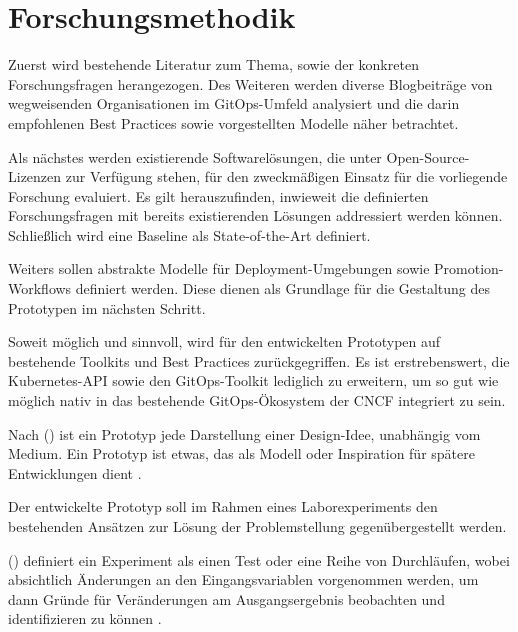 \chapter{Forschungsmethodik}

Zuerst wird bestehende Literatur zum Thema, 
sowie der konkreten Forschungsfragen herangezogen.
Des Weiteren werden
diverse Blogbeiträge von wegweisenden Organisationen im GitOps-Umfeld analysiert
und die darin empfohlenen Best Practices sowie vorgestellten Modelle näher betrachtet.
\bigskip

\noindent
Als nächstes werden existierende Softwarelösungen,
die unter Open-Source-Lizenzen zur Verfügung stehen,
für den zweckmäßigen Einsatz für die vorliegende Forschung evaluiert.
Es gilt herauszufinden, inwieweit die definierten Forschungsfragen
mit bereits existierenden Lösungen
addressiert werden können.
Schließlich wird eine Baseline als State-of-the-Art definiert.
\bigskip

\noindent
Weiters sollen abstrakte Modelle für Deployment-Umgebungen
sowie Promotion-Workflows definiert werden.
Diese dienen als Grundlage für die Gestaltung des Prototypen
im nächsten Schritt.
\bigskip

\noindent
Soweit möglich und sinnvoll, wird für den entwickelten Prototypen
auf bestehende Toolkits und Best Practices zurückgegriffen.
Es ist erstrebenswert,
die Kubernetes-API
sowie den
GitOps-Toolkit
lediglich zu erweitern,
um so gut wie möglich nativ in das bestehende GitOps-Ökosystem 
der CNCF
integriert zu sein.
\bigskip

\noindent
Nach 
\citeauthor{HOUDE1997367} (\citeyear{HOUDE1997367})
ist ein Prototyp jede Darstellung einer Design-Idee, unabhängig vom Medium.
Ein Prototyp ist etwas, das als Modell oder Inspiration für spätere Entwicklungen dient
\autocite{HOUDE1997367}.
\bigskip

\noindent
Der entwickelte Prototyp soll im Rahmen eines Laborexperiments
den bestehenden Ansätzen zur Lösung der Problemstellung gegenübergestellt werden.
\bigskip

\noindent
\citeauthor{montgomery2017design} (\citeyear{montgomery2017design}) definiert ein Experiment als einen Test 
oder eine Reihe von Durchläufen, wobei absichtlich Änderungen an den Eingangsvariablen vorgenommen werden, 
um dann Gründe für Veränderungen am Ausgangsergebnis beobachten und identifizieren zu können 
\autocite{montgomery2017design}.






